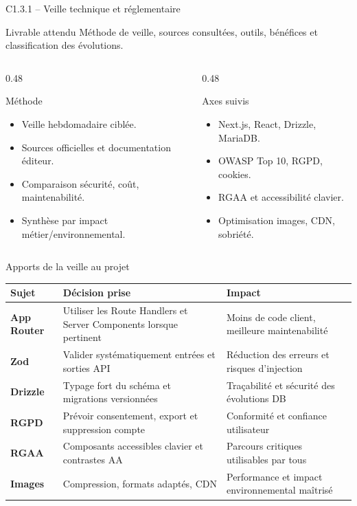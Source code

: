 \documentclass[aspectratio=169,11pt]{beamer}
\newcommand{\competence}[2]{%
  \begin{block}{#1}
    #2
  \end{block}
}
\begin{document}
\begin{frame}{C1.3.1 -- Veille technique et réglementaire}
  \competence{Livrable attendu}{Méthode de veille, sources consultées, outils, bénéfices et classification des évolutions.}
  \begin{columns}[T]
    \begin{column}{0.48\textwidth}
      \begin{block}{Méthode}
        \begin{itemize}
          \item Veille hebdomadaire ciblée.
          \item Sources officielles et documentation éditeur.
          \item Comparaison sécurité, coût, maintenabilité.
          \item Synthèse par impact métier/environnemental.
        \end{itemize}
      \end{block}
    \end{column}
    \begin{column}{0.48\textwidth}
      \begin{block}{Axes suivis}
        \begin{itemize}
          \item Next.js, React, Drizzle, MariaDB.
          \item OWASP Top 10, RGPD, cookies.
          \item RGAA et accessibilité clavier.
          \item Optimisation images, CDN, sobriété.
        \end{itemize}
      \end{block}
    \end{column}
  \end{columns}
\end{frame}

\begin{frame}{Apports de la veille au projet}
  \small
  \begin{tabularx}{\textwidth}{>{\bfseries}p{3cm} X X}
    Sujet & Décision prise & Impact \\
    \hline
    App Router & Utiliser les Route Handlers et Server Components lorsque pertinent & Moins de code client, meilleure maintenabilité \\
    Zod & Valider systématiquement entrées et sorties API & Réduction des erreurs et risques d'injection \\
    Drizzle & Typage fort du schéma et migrations versionnées & Traçabilité et sécurité des évolutions DB \\
    RGPD & Prévoir consentement, export et suppression compte & Conformité et confiance utilisateur \\
    RGAA & Composants accessibles clavier et contrastes AA & Parcours critiques utilisables par tous \\
    Images & Compression, formats adaptés, CDN & Performance et impact environnemental maîtrisé \\
  \end{tabularx}
\end{frame}
\end{document}
